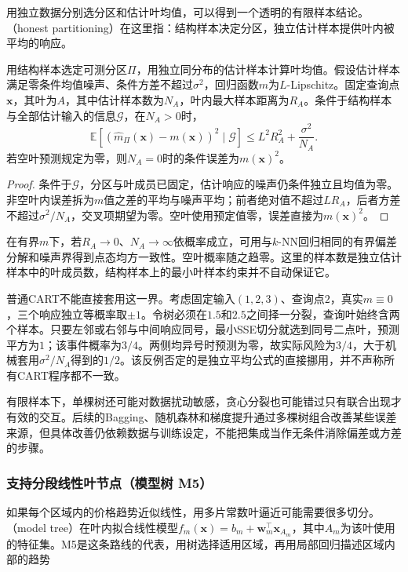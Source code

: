 用独立数据分别选分区和估计叶均值，可以得到一个透明的有限样本结论。（honest partitioning）在这里指：结构样本决定分区，独立估计样本提供叶内被平均的响应。

\begin{theorem}[独立分区下的叶平均误差]
  \label{thm:regression-honest-tree}
  用结构样本选定可测分区$\Pi$，用独立同分布的估计样本计算叶均值。假设估计样本满足零条件均值噪声、条件方差不超过$\sigma^2$，回归函数$m$为$L$-Lipschitz。固定查询点$\bm{x}$，其叶为$A$，其中估计样本数为$N_A$，叶内最大样本距离为$R_A$。条件于结构样本与全部估计输入的信息$\mathcal G$，在$N_A>0$时，
  \[
    \mathbb{E}[(\widehat m_\Pi(\bm{x})-m(\bm{x}))^2\mid\mathcal G]
    \leq L^2R_A^2+\frac{\sigma^2}{N_A}.
  \]
  若空叶预测规定为零，则$N_A=0$时的条件误差为$m(\bm{x})^2$。
\end{theorem}

\begin{proof}
条件于$\mathcal G$，分区与叶成员已固定，估计响应的噪声仍条件独立且均值为零。非空叶内误差拆为$m$值之差的平均与噪声平均；前者绝对值不超过$LR_A$，后者方差不超过$\sigma^2/N_A$，交叉项期望为零。空叶使用预定值零，误差直接为$m(\bm{x})^2$。
\end{proof}

在有界$m$下，若$R_A\to0$、$N_A\to\infty$依概率成立，可用与$k$-NN回归相同的有界偏差分解和噪声界得到点态均方一致性。空叶概率随之趋零。这里的样本数是独立估计样本中的叶成员数，结构样本上的最小叶样本约束并不自动保证它。

普通CART不能直接套用这一界。考虑固定输入$(1,2,3)$、查询点$2$，真实$m\equiv0$，三个响应独立等概率取$\pm1$。令树必须在$1.5$和$2.5$之间择一分裂，查询叶始终含两个样本。只要左邻或右邻与中间响应同号，最小SSE切分就选到同号二点叶，预测平方为$1$；该事件概率为$3/4$。两侧均异号时预测为零，故实际风险为$3/4$，大于机械套用$\sigma^2/N_A$得到的$1/2$。该反例否定的是独立平均公式的直接挪用，并不声称所有CART程序都不一致。

有限样本下，单棵树还可能对数据扰动敏感，贪心分裂也可能错过只有联合出现才有效的交互。后续的Bagging、随机森林和梯度提升通过多棵树组合改善某些误差来源，但具体改善仍依赖数据与训练设定，不能把集成当作无条件消除偏差或方差的步骤。

\subsubsection{支持分段线性叶节点（模型树 M5）}
\label{sec:regression-model-tree}

如果每个区域内的价格趋势近似线性，用多片常数叶逼近可能需要很多切分。（model tree）在叶内拟合线性模型$f_m(\bm{x})=b_m+\bm{w}_m^{\top}\bm{x}_{A_m}$，其中$A_m$为该叶使用的特征集。M5是这条路线的代表，用树选择适用区域，再用局部回归描述区域内部的趋势


